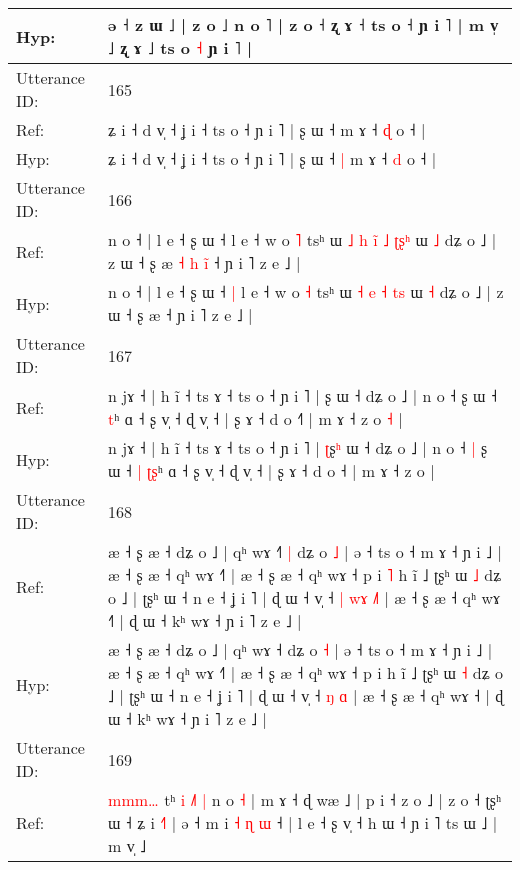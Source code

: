 \documentclass[10pt]{article}
\DeclareRobustCommand{\hl}[1]{{\textcolor{red}{#1}}}
\begin{document}
\begin{longtable}{ll}
Hyp: & ə ˧ z ɯ ˩ | z o ˩ n o ˥ | z o ˧ ʐ ɤ ˧ ts o ˧ ɲ i ˥ | m v̩ ˩ ʐ ɤ ˩ ts o \hl{˧} ɲ i ˥ |
 \\
\midrule
Utterance ID: & 165 \\
Ref: & ʑ i ˧ d v̩ ˧ ʝ i ˧ ts o ˧ ɲ i ˥ | ʂ ɯ ˧\hl{}\hl{} m ɤ ˧ \hl{ɖ} o ˧ |
 \\
Hyp: & ʑ i ˧ d v̩ ˧ ʝ i ˧ ts o ˧ ɲ i ˥ | ʂ ɯ ˧\hl{ }\hl{|} m ɤ ˧ \hl{d} o ˧ |
 \\
\midrule
Utterance ID: & 166 \\
Ref: & n o ˧ | l e ˧ ʂ ɯ ˧\hl{}\hl{} l e ˧ w o \hl{˥} tsʰ ɯ\hl{ }\hl{˩} \hl{h} \hl{i}\hl{̃} \hl{˩} \hl{ʈ}\hl{ʂ}\hl{ʰ} ɯ \hl{˩} dʑ o ˩ | z ɯ ˧ ʂ æ\hl{ }\hl{˧}\hl{ }\hl{h}\hl{ }\hl{i}\hl{̃} ˧ ɲ i ˥ z e ˩ |
 \\
Hyp: & n o ˧ | l e ˧ ʂ ɯ ˧\hl{ }\hl{|} l e ˧ w o \hl{˧} tsʰ ɯ\hl{}\hl{} \hl{˧} \hl{}\hl{e} \hl{˧} \hl{}\hl{t}\hl{s} ɯ \hl{˧} dʑ o ˩ | z ɯ ˧ ʂ æ\hl{}\hl{}\hl{}\hl{}\hl{}\hl{}\hl{} ˧ ɲ i ˥ z e ˩ |
 \\
\midrule
Utterance ID: & 167 \\
Ref: & n jɤ ˧ | h ĩ ˧ ts ɤ ˧ ts o ˧ ɲ i ˥ | \hl{}ʂ\hl{} ɯ ˧ dʑ o ˩ | n o ˧\hl{}\hl{} ʂ ɯ ˧\hl{}\hl{} \hl{}\hl{t}ʰ ɑ ˧ ʂ v̩ ˧ ɖ v̩ ˧ | ʂ ɤ ˧ d o ˧\hl{˥} | m ɤ ˧ z o\hl{ }\hl{˧} |
 \\
Hyp: & n jɤ ˧ | h ĩ ˧ ts ɤ ˧ ts o ˧ ɲ i ˥ | \hl{ʈ}ʂ\hl{ʰ} ɯ ˧ dʑ o ˩ | n o ˧\hl{ }\hl{|} ʂ ɯ ˧\hl{ }\hl{|} \hl{ʈ}\hl{ʂ}ʰ ɑ ˧ ʂ v̩ ˧ ɖ v̩ ˧ | ʂ ɤ ˧ d o ˧\hl{} | m ɤ ˧ z o\hl{}\hl{} |
 \\
\midrule
Utterance ID: & 168 \\
Ref: & æ ˧ ʂ æ ˧ dʑ o ˩ | qʰ wɤ ˧\hl{˥}\hl{ }\hl{|} dʑ o \hl{˩} | ə ˧ ts o ˧ m ɤ ˧ ɲ i ˩ | æ ˧ ʂ æ ˧ qʰ wɤ ˧˥ | æ ˧ ʂ æ ˧ qʰ wɤ ˧ p i\hl{ }\hl{˥} h ĩ ˩ ʈʂʰ ɯ \hl{˩} dʑ o ˩ | ʈʂʰ ɯ ˧ n e ˧ ʝ i ˥ | ɖ ɯ ˧ v̩ ˧\hl{ }\hl{|} \hl{w}\hl{ɤ} \hl{˩}\hl{˥} | æ ˧ ʂ æ ˧ qʰ wɤ ˧\hl{˥} | ɖ ɯ ˧ kʰ wɤ ˧ ɲ i ˥ z e ˩ |
 \\
Hyp: & æ ˧ ʂ æ ˧ dʑ o ˩ | qʰ wɤ ˧\hl{}\hl{}\hl{} dʑ o \hl{˧} | ə ˧ ts o ˧ m ɤ ˧ ɲ i ˩ | æ ˧ ʂ æ ˧ qʰ wɤ ˧˥ | æ ˧ ʂ æ ˧ qʰ wɤ ˧ p i\hl{}\hl{} h ĩ ˩ ʈʂʰ ɯ \hl{˧} dʑ o ˩ | ʈʂʰ ɯ ˧ n e ˧ ʝ i ˥ | ɖ ɯ ˧ v̩ ˧\hl{}\hl{} \hl{}\hl{ŋ} \hl{}\hl{ɑ} | æ ˧ ʂ æ ˧ qʰ wɤ ˧\hl{} | ɖ ɯ ˧ kʰ wɤ ˧ ɲ i ˥ z e ˩ |
 \\
\midrule
Utterance ID: & 169 \\
Ref: & \hl{m}\hl{m}\hl{m}\hl{…}\hl{ }tʰ\hl{ }\hl{i} \hl{˩}\hl{˥} \hl{|} n o \hl{˧} | m ɤ ˧ ɖ wæ ˩ | p i ˧ z o ˩ | z o ˧ ʈʂʰ ɯ ˧ ʑ i \hl{˧}˥ | ə ˧ m i\hl{ }\hl{˧}\hl{ }\hl{ɳ}\hl{ }\hl{ɯ} ˧ | l e ˧ ʂ v̩ ˧ h ɯ ˧ ɲ i ˥ ts ɯ ˩ | m v̩ ˩
 \\

\end{longtable}
\end{document}
